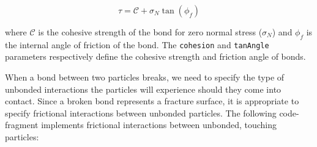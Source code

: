 \begin{equation}
\tau = \mathcal{C} + \sigma_N \tan (\phi_f)
\end{equation}

\noindent
where $\mathcal{C}$ is the cohesive strength of the bond for zero normal stress ($\sigma_N$) and $\phi_f$ is the internal angle of friction of the bond. The \texttt{cohesion} and \texttt{tanAngle} parameters respectively define the cohesive strength and friction angle of bonds.




When a bond between two particles breaks, we need to specify the type of unbonded interactions the particles will experience should they come into contact. Since a broken bond represents a fracture surface, it is appropriate to specify frictional interactions between unbonded particles. The following code-fragment implements frictional interactions between unbonded, touching particles:


